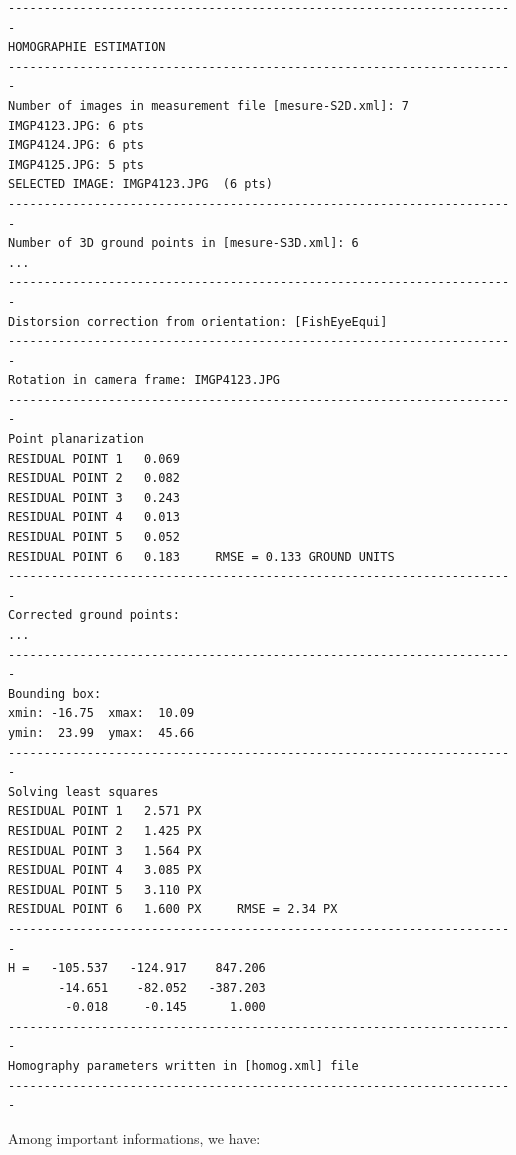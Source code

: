 \begin{verbatim}
-----------------------------------------------------------------------
HOMOGRAPHIE ESTIMATION                         
-----------------------------------------------------------------------
Number of images in measurement file [mesure-S2D.xml]: 7
IMGP4123.JPG: 6 pts
IMGP4124.JPG: 6 pts
IMGP4125.JPG: 5 pts
SELECTED IMAGE: IMGP4123.JPG  (6 pts)
-----------------------------------------------------------------------
Number of 3D ground points in [mesure-S3D.xml]: 6
...
-----------------------------------------------------------------------
Distorsion correction from orientation: [FishEyeEqui]
-----------------------------------------------------------------------
Rotation in camera frame: IMGP4123.JPG
-----------------------------------------------------------------------
Point planarization
RESIDUAL POINT 1   0.069
RESIDUAL POINT 2   0.082
RESIDUAL POINT 3   0.243
RESIDUAL POINT 4   0.013
RESIDUAL POINT 5   0.052
RESIDUAL POINT 6   0.183     RMSE = 0.133 GROUND UNITS
-----------------------------------------------------------------------
Corrected ground points: 
...
-----------------------------------------------------------------------
Bounding box:
xmin: -16.75  xmax:  10.09
ymin:  23.99  ymax:  45.66
-----------------------------------------------------------------------
Solving least squares
RESIDUAL POINT 1   2.571 PX
RESIDUAL POINT 2   1.425 PX
RESIDUAL POINT 3   1.564 PX
RESIDUAL POINT 4   3.085 PX
RESIDUAL POINT 5   3.110 PX
RESIDUAL POINT 6   1.600 PX     RMSE = 2.34 PX
-----------------------------------------------------------------------
H =   -105.537   -124.917    847.206
       -14.651    -82.052   -387.203
        -0.018     -0.145      1.000
-----------------------------------------------------------------------
Homography parameters written in [homog.xml] file
-----------------------------------------------------------------------
\end{verbatim}

\noindent Among important informations, we have: \newline

